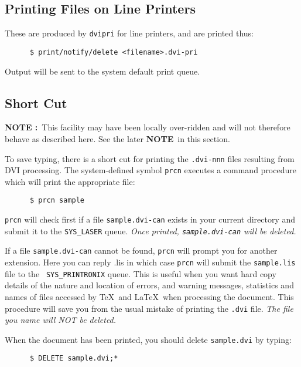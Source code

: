 \subsection{Printing Files on Line Printers}

These are produced by \verb+dvipri+ for line printers, and are printed thus:
\begin{verbatim} 
      $ print/notify/delete <filename>.dvi-pri 
\end{verbatim}
Output will be sent to the system default print queue. 
                                               


\subsection{Short Cut}

{\bf NOTE :}~This facility may have been locally over-ridden and will not
therefore behave as described here. See the later {\bf NOTE}~in this section. 

To save typing, there is a short cut for printing the \mbox{\tt .dvi-nnn} files
resulting from DVI processing. The system-defined symbol \mbox{\tt prcn} 
executes a command procedure which will print the appropriate file:
\begin{verbatim}
      $ prcn sample
\end{verbatim}

\mbox{\tt prcn} will check first if a file \mbox{\tt sample.dvi-can} exists in 
your current directory and submit it to the \mbox{\tt SYS\_LASER} queue. 
{\em Once printed, \mbox{\tt sample.dvi-can} will be deleted.}

If a file \mbox{\tt sample.dvi-can} cannot be found, \mbox{\tt prcn} will 
prompt you for another extension. Here you can reply .lis in which case 
\mbox{\tt prcn} will submit the \mbox{\tt sample.lis} file to the  \mbox{\tt
SYS\_PRINTRONIX} queue. This is useful when you want hard copy  details of the
nature and location of errors, and warning messages, statistics and  names of
files accessed by \TeX\ and \LaTeX\ when processing the document.  This
procedure will save you from the usual mistake of printing the  \mbox{\tt .dvi}
file. {\em The file you name will NOT be deleted.}

When the document has been printed, you should delete
\mbox{\tt sample.dvi} by typing:
\begin{verbatim}
      $ DELETE sample.dvi;*
\end{verbatim}

